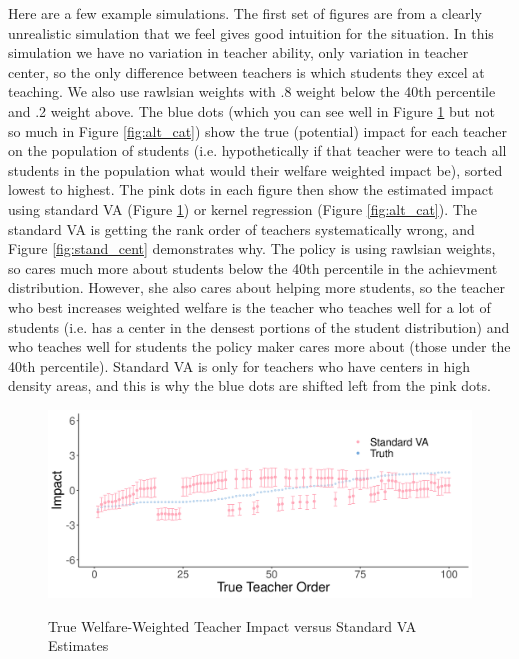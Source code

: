 \documentclass[letterpaper,12pt]{article}
\begin{document}
Here are a few example simulations. The first set of figures are from a clearly unrealistic simulation that we feel gives good intuition for the situation. In this simulation we have no variation in teacher ability, only variation in teacher center, so the only difference between teachers is which students they excel at teaching. We also use rawlsian weights with .8 weight below the 40th percentile and .2 weight above. The blue dots (which you can see well in Figure \ref{fig:stand_cat} but not so much in Figure \ref{fig:alt_cat}) show the true (potential) impact for each teacher on the population of students (i.e. hypothetically if that teacher were to teach all students in the population what would their welfare weighted impact be), sorted lowest to highest. The pink dots in each figure then show the estimated impact using standard VA (Figure \ref{fig:stand_cat}) or kernel regression (Figure \ref{fig:alt_cat}). The standard VA is getting the rank order of teachers systematically wrong, and Figure \ref{fig:stand_cent} demonstrates why. The policy is using rawlsian weights, so cares much more about students below the 40th percentile in the achievment distribution. However, she also cares about helping more students, so the teacher who best increases weighted welfare is the teacher who teaches well for a lot of students (i.e. has a center in the densest portions of the student distribution) and who teaches well for students the policy maker cares more about (those under the 40th percentile). Standard VA is only for teachers who have centers in high density areas, and this is why the blue dots are shifted left from the pink dots.

\begin{figure}[ht]
    \centering
    \caption{True Welfare-Weighted Teacher Impact versus Standard VA Estimates}
    \includegraphics[width=.9\textwidth]{slides/CIERS_Figures/standard_cat_run_2.png}
    \label{fig:stand_cat}
\end{figure}
\end{document}
